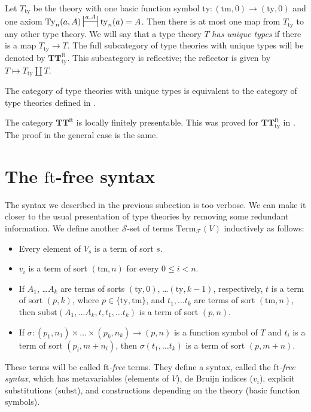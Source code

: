 \documentclass[reqno]{amsart}
\theoremstyle{definition}
\theoremstyle{remark}
\newcommand{\fs}[1]{\mathrm{#1}}
\newcommand{\Term}{\fs{Term}}
\newcommand{\subst}{\fs{subst}}
\newcommand{\ft}{\fs{ft}}
\newcommand{\ty}{\fs{ty}}
\newcommand{\Ty}{\fs{Ty}}
\newcommand{\tm}{\fs{tm}}
\newcommand{\cat}[1]{\mathbf{#1}}
\newcommand{\algtt}{\cat{TT}}
\numberwithin{figure}{section}
\begin{document}
Let $T_\ty$ be the theory with one basic function symbol $\ty : (\tm,0) \to (\ty,0)$ and one axiom $\Ty_n(a,A) \ssststile{}{a,A} \ty_n(a) = A$.
Then there is at most one map from $T_\ty$ to any other type theory.
We will say that a type theory $T$ \emph{has unique types} if there is a map $T_\ty \to T$.
The full subcategory of type theories with unique types will be denoted by $\algtt^\ft_\ty$.
This subcategory is reflective; the reflector is given by $T \mapsto T_\ty \amalg T$.

\begin{remark}
The category of type theories with unique types is equivalent to the category of type theories defined in \cite[Definition~4.5]{alg-tt}.
\end{remark}

\begin{remark}
The category $\algtt^\ft$ is locally finitely presentable.
This was proved for $\algtt^\ft_\ty$ in \cite[Corollary~3.2]{morita-equiv}.
The proof in the general case is the same.
\end{remark}

\section{The $\ft$-free syntax}
\label{sec:contexts}

The syntax we described in the previous subection is too verbose.
We can make it closer to the usual presentation of type theories by removing some redundant information.
We define another $\mathcal{S}$-set of terms $\Term_\mathcal{F}(V)$ inductively as follows:
\begin{itemize}
\item Every element of $V_s$ is a term of sort $s$.
\item $v_i$ is a term of sort $(\tm,n)$ for every $0 \leq i < n$.
\item If $A_1$, \ldots $A_k$ are terms of sorts $(\ty,0)$, \ldots $(\ty,k-1)$, respectively, $t$ is a term of sort $(p,k)$, where $p \in \{ \ty, \tm \}$, and $t_1, \ldots t_k$ are terms of sort $(\tm,n)$, then $\subst(A_1, \ldots A_k, t, t_1, \ldots t_k)$ is a term of sort $(p,n)$.
\item If $\sigma : (p_1,n_1) \times \ldots \times (p_k,n_k) \to (p,n)$ is a function symbol of $T$ and $t_i$ is a term of sort $(p_i,m+n_i)$, then $\sigma(t_1, \ldots t_k)$ is a term of sort $(p,m+n)$.
\end{itemize}
These terms will be called \emph{$\ft$-free} terms.
They define a syntax, called the \emph{$\ft$-free syntax}, which has metavariables (elements of $V$), de Bruijn indices ($v_i$), explicit substitutions ($\subst$), and constructions depending on the theory (basic function symbols).
\end{document}
